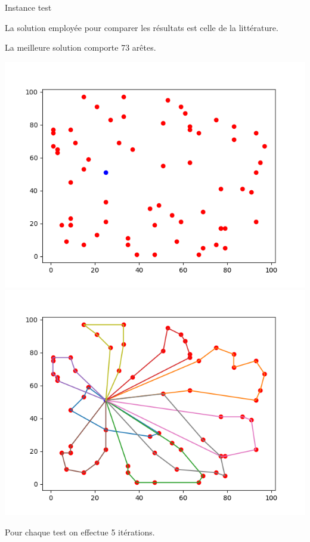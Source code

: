 \documentclass{beamer}
\begin{document}
\begin{frame}{Instance test}

La solution employée pour comparer les résultats est celle de la littérature.

La meilleure solution comporte 73 arêtes.

\includegraphics[scale=0.3]{Instance6509.png}
\includegraphics[scale=0.3]{Solution6509.png}

Pour chaque test on effectue 5 itérations.
\end{frame}
\end{document}
